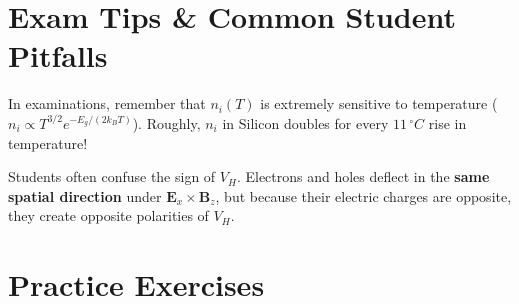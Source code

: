 \section{Exam Tips \& Common Student Pitfalls}

\begin{examtip}
In examinations, remember that $n_i(T)$ is extremely sensitive to temperature ($n_i \propto T^{3/2} e^{-E_g / (2k_B T)}$). Roughly, $n_i$ in Silicon doubles for every $11\,\si{^\circ C}$ rise in temperature!
\end{examtip}

\begin{commonmistake}
Students often confuse the sign of $V_H$. Electrons and holes deflect in the \textbf{same spatial direction} under $\mathbf{E}_x \times \mathbf{B}_z$, but because their electric charges are opposite, they create opposite polarities of $V_H$.
\end{commonmistake}

\section{Practice Exercises}

